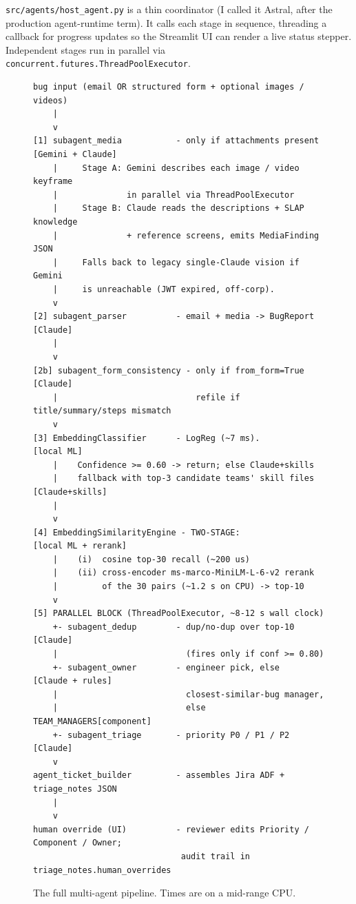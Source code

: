 \documentclass[11pt,a4paper]{article}
\begin{document}
\texttt{src/agents/host\_agent.py} is a thin coordinator (I called it
Astral, after the production agent-runtime term). It calls each stage in
sequence, threading a callback for progress updates so the Streamlit UI can
render a live status stepper. Independent stages run in parallel via
\texttt{concurrent.futures.ThreadPoolExecutor}.

\begin{figure}[h]
\centering
\begin{minipage}{0.95\textwidth}
\begin{lstlisting}
bug input (email OR structured form + optional images / videos)
    |
    v
[1] subagent_media           - only if attachments present     [Gemini + Claude]
    |     Stage A: Gemini describes each image / video keyframe
    |              in parallel via ThreadPoolExecutor
    |     Stage B: Claude reads the descriptions + SLAP knowledge
    |              + reference screens, emits MediaFinding JSON
    |     Falls back to legacy single-Claude vision if Gemini
    |     is unreachable (JWT expired, off-corp).
    v
[2] subagent_parser          - email + media -> BugReport     [Claude]
    |
    v
[2b] subagent_form_consistency - only if from_form=True       [Claude]
    |                            refile if title/summary/steps mismatch
    v
[3] EmbeddingClassifier      - LogReg (~7 ms).                [local ML]
    |    Confidence >= 0.60 -> return; else Claude+skills
    |    fallback with top-3 candidate teams' skill files      [Claude+skills]
    |
    v
[4] EmbeddingSimilarityEngine - TWO-STAGE:                    [local ML + rerank]
    |    (i)  cosine top-30 recall (~200 us)
    |    (ii) cross-encoder ms-marco-MiniLM-L-6-v2 rerank
    |         of the 30 pairs (~1.2 s on CPU) -> top-10
    v
[5] PARALLEL BLOCK (ThreadPoolExecutor, ~8-12 s wall clock)
    +- subagent_dedup        - dup/no-dup over top-10         [Claude]
    |                          (fires only if conf >= 0.80)
    +- subagent_owner        - engineer pick, else            [Claude + rules]
    |                          closest-similar-bug manager,
    |                          else TEAM_MANAGERS[component]
    +- subagent_triage       - priority P0 / P1 / P2          [Claude]
    v
agent_ticket_builder         - assembles Jira ADF + triage_notes JSON
    |
    v
human override (UI)          - reviewer edits Priority / Component / Owner;
                              audit trail in triage_notes.human_overrides
\end{lstlisting}
\end{minipage}
\caption{The full multi-agent pipeline. Times are on a mid-range CPU.}
\end{figure}
\end{document}

